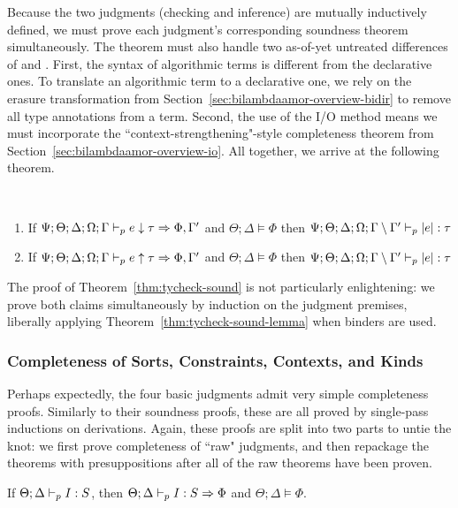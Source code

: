 Because the two judgments (checking and inference) are mutually inductively defined, we must prove each judgment's corresponding soundness theorem simultaneously. The theorem must also handle two as-of-yet untreated differences of \bilambdaamor and \dlambdaamor. First, the syntax of algorithmic terms is different from the declarative ones. To translate an algorithmic term to a declarative one, we rely on the erasure transformation from Section~\ref{sec:bilambdaamor-overview-bidir} to remove all type annotations from a term. Second, the use of the I/O method means we must incorporate the ``context-strengthening"-style completeness theorem from Section~\ref{sec:bilambdaamor-overview-io}. All together, we arrive at the following theorem.

\begin{theorem}
~\begin{enumerate}
 \item If $\Psi;\Theta;\Delta;\Omega;\Gamma \vdash_p e \downarrow \tau \Rightarrow \Phi, \Gamma'$ and $\Theta;\Delta \vDash \Phi$ then $\Psi;\Theta;\Delta;\Omega;\Gamma \setminus \Gamma' \vdash_p |e| : \tau$
 \item If $\Psi;\Theta;\Delta;\Omega;\Gamma \vdash_p e \uparrow \tau \Rightarrow \Phi, \Gamma'$ and $\Theta;\Delta \vDash \Phi$ then $\Psi;\Theta;\Delta;\Omega;\Gamma \setminus \Gamma' \vdash_p |e| : \tau$
\end{enumerate}
\label{thm:tycheck-sound}
\end{theorem}

The proof of Theorem~\ref{thm:tycheck-sound} is not particularly enlightening: we prove both claims simultaneously by induction on the judgment premises, liberally applying Theorem~\ref{thm:tycheck-sound-lemma} when binders are used.


\subsubsection{Completeness of Sorts, Constraints, Contexts, and Kinds}
Perhaps expectedly, the four basic judgments admit very simple completeness proofs. Similarly to their soundness proofs, these are all proved by single-pass inductions on derivations. Again, these proofs are split into two parts to untie the knot: we first prove completeness of ``raw" judgments, and then repackage the theorems with presuppositions after all of the raw theorems have been proven.


\begin{theorem}
If $\Theta;\Delta \vdash_p I : S$, then $\Theta;\Delta \vdash_p I : S \Rightarrow \Phi$ and $\Theta;\Delta \vDash \Phi$.
\label{thm:sort-compl}
\end{theorem}

